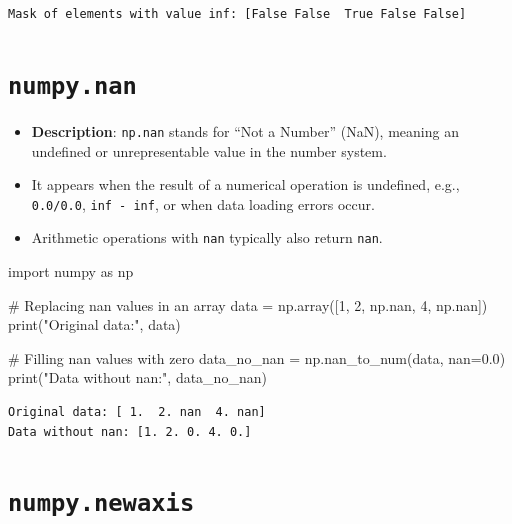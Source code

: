 \documentclass[
  english,
  letterpaper,
  DIV=11,
  numbers=noendperiod]{scrreprt}
\newenvironment{Shaded}{\begin{snugshade}}{\end{snugshade}}
\newcommand{\BuiltInTok}[1]{\textcolor[rgb]{0.00,0.23,0.31}{#1}}
\newcommand{\CommentTok}[1]{\textcolor[rgb]{0.37,0.37,0.37}{#1}}
\newcommand{\DecValTok}[1]{\textcolor[rgb]{0.68,0.00,0.00}{#1}}
\newcommand{\FloatTok}[1]{\textcolor[rgb]{0.68,0.00,0.00}{#1}}
\newcommand{\ImportTok}[1]{\textcolor[rgb]{0.00,0.46,0.62}{#1}}
\newcommand{\NormalTok}[1]{\textcolor[rgb]{0.00,0.23,0.31}{#1}}
\newcommand{\OperatorTok}[1]{\textcolor[rgb]{0.37,0.37,0.37}{#1}}
\newcommand{\StringTok}[1]{\textcolor[rgb]{0.13,0.47,0.30}{#1}}
\providecommand{\tightlist}{%
  \setlength{\itemsep}{0pt}\setlength{\parskip}{0pt}}
\begin{document}
\begin{verbatim}
Mask of elements with value inf: [False False  True False False]
\end{verbatim}

\section{\texorpdfstring{\texttt{numpy.nan}}{numpy.nan}}\label{numpy.nan}

\begin{itemize}
\tightlist
\item
  \textbf{Description}: \texttt{np.nan} stands for ``Not a Number''
  (NaN), meaning an undefined or unrepresentable value in the number
  system.\\
\item
  It appears when the result of a numerical operation is undefined,
  e.g., \texttt{0.0/0.0}, \texttt{inf\ -\ inf}, or when data loading
  errors occur.\\
\item
  Arithmetic operations with \texttt{nan} typically also return
  \texttt{nan}.
\end{itemize}

\begin{Shaded}
\begin{Highlighting}[]
\ImportTok{import}\NormalTok{ numpy }\ImportTok{as}\NormalTok{ np}

\CommentTok{\# Replacing nan values in an array}
\NormalTok{data }\OperatorTok{=}\NormalTok{ np.array([}\DecValTok{1}\NormalTok{, }\DecValTok{2}\NormalTok{, np.nan, }\DecValTok{4}\NormalTok{, np.nan])}
\BuiltInTok{print}\NormalTok{(}\StringTok{"Original data:"}\NormalTok{, data)}

\CommentTok{\# Filling nan values with zero}
\NormalTok{data\_no\_nan }\OperatorTok{=}\NormalTok{ np.nan\_to\_num(data, nan}\OperatorTok{=}\FloatTok{0.0}\NormalTok{)}
\BuiltInTok{print}\NormalTok{(}\StringTok{"Data without nan:"}\NormalTok{, data\_no\_nan)}
\end{Highlighting}
\end{Shaded}

\begin{verbatim}
Original data: [ 1.  2. nan  4. nan]
Data without nan: [1. 2. 0. 4. 0.]
\end{verbatim}

\section{\texorpdfstring{\texttt{numpy.newaxis}}{numpy.newaxis}}\label{numpy.newaxis}
\end{document}
